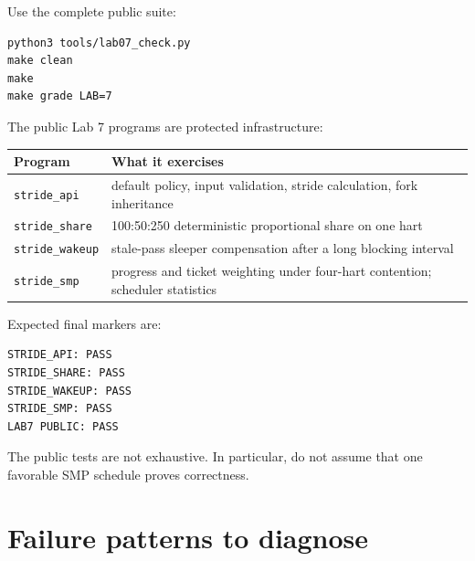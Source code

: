 \documentclass[11pt,a4paper]{article}
\newcommand{\file}[1]{\texttt{#1}}
\begin{document}
Use the complete public suite:

\begin{lstlisting}
python3 tools/lab07_check.py
make clean
make
make grade LAB=7
\end{lstlisting}

The public Lab 7 programs are protected infrastructure:

\begin{center}
\begin{tabularx}{0.96\textwidth}{@{}p{32mm}X@{}}
\toprule
\textbf{Program} & \textbf{What it exercises} \\
\midrule
\file{stride\_api} & default policy, input validation, stride calculation, fork inheritance \\
\file{stride\_share} & 100:50:250 deterministic proportional share on one hart \\
\file{stride\_wakeup} & stale-pass sleeper compensation after a long blocking interval \\
\file{stride\_smp} & progress and ticket weighting under four-hart contention; scheduler statistics \\
\bottomrule
\end{tabularx}
\end{center}

Expected final markers are:

\begin{lstlisting}
STRIDE_API: PASS
STRIDE_SHARE: PASS
STRIDE_WAKEUP: PASS
STRIDE_SMP: PASS
LAB7 PUBLIC: PASS
\end{lstlisting}

The public tests are not exhaustive. In particular, do not assume that one favorable SMP schedule proves correctness.

\section{Failure patterns to diagnose}
\end{document}
